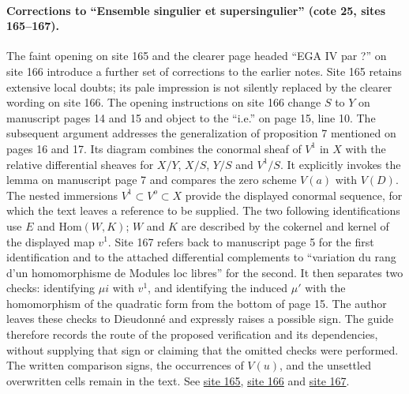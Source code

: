 \paragraph{Corrections to ``Ensemble singulier et supersingulier'' (cote 25, sites 165--167).}
The faint opening on site 165 and the clearer page headed ``EGA IV par ?'' on site 166 introduce a further set of corrections to the earlier notes. Site 165 retains extensive local doubts; its pale impression is not silently replaced by the clearer wording on site 166. The opening instructions on site 166 change $S$ to $Y$ on manuscript pages 14 and 15 and object to the ``i.e.'' on page 15, line 10. The subsequent argument addresses the generalization of proposition 7 mentioned on pages 16 and 17. Its diagram combines the conormal sheaf of $V^1$ in $X$ with the relative differential sheaves for $X/Y$, $X/S$, $Y/S$ and $V^1/S$. It explicitly invokes the lemma on manuscript page 7 and compares the zero scheme $V(a)$ with $V(D)$. The nested immersions $V^1\subset V^o\subset X$ provide the displayed conormal sequence, for which the text leaves a reference to be supplied. The two following identifications use $E$ and $\mathrm{Hom}(W,K)$; $W$ and $K$ are described by the cokernel and kernel of the displayed map $v^1$. Site 167 refers back to manuscript page 5 for the first identification and to the attached differential complements to ``variation du rang d'un homomorphisme de Modules loc libres'' for the second. It then separates two checks: identifying $\mu i$ with $v^1$, and identifying the induced $\mu'$ with the homomorphism of the quadratic form from the bottom of page 15. The author leaves these checks to Dieudonné and expressly raises a possible sign. The guide therefore records the route of the proposed verification and its dependencies, without supplying that sign or claiming that the omitted checks were performed. The written comparison signs, the occurrences of $V(u)$, and the unsettled overwritten cells remain in the text. See \href{https://grothendieck.umontpellier.fr/web/viewer.html?file=../25.pdf#page=166}{site 165}, \href{https://grothendieck.umontpellier.fr/web/viewer.html?file=../25.pdf#page=167}{site 166} and \href{https://grothendieck.umontpellier.fr/web/viewer.html?file=../25.pdf#page=168}{site 167}.

